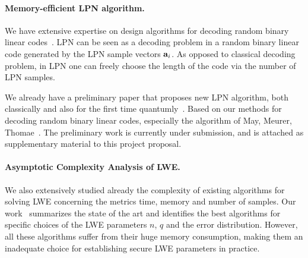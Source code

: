 
\paragraph{Memory-efficient LPN algorithm.} We have extensive expertise on design algorithms for decoding random binary linear codes~\cite{Codes11,Codes12,Codes15}. LPN  can be seen as a decoding problem in a random binary linear code generated by the LPN sample vectors $\mathbf a_i$. As opposed to classical decoding problem, in LPN one can freely choose the length of the code via the number of LPN samples.

We already have a preliminary paper that proposes new LPN algorithm, both classically and also for the first time quantumly~\cite{LPN}.  Based on our methods for decoding random binary linear codes, especially the algorithm of May, Meurer, Thomae~\cite{Codes11}. The preliminary work is currently under submission, and is attached as supplementary material to this project proposal.

\paragraph{Asymptotic Complexity Analysis of LWE.} We also extensively studied already the complexity of existing algorithms for solving LWE concerning the metrics time, memory and number of samples. Our work~\cite{LWE} summarizes the state of the art and identifies the best algorithms for specific choices of the LWE parameters $n$, $q$ and the error distribution. However, all these algorithms suffer from their huge memory consumption, making them an inadequate choice for establishing secure LWE parameters in practice.